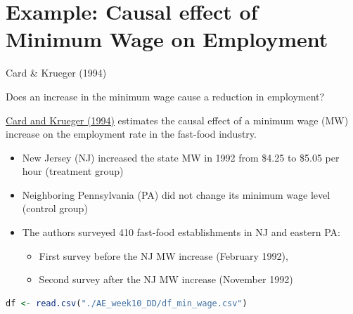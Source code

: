 \documentclass[9pt,aspectratio=169]{beamer}
\begin{document}
\section{Example:  Causal effect of Minimum Wage on Employment}

\begin{frame}[fragile]{Card \& Krueger (1994)}
\linespread{1.3}\selectfont %
\begin{center}
        Does an increase in the minimum wage \alert{cause} a reduction in employment?
    \end{center}
\pause
\hyperlink{https://davidcard.berkeley.edu/papers/njmin-aer.pdf}{Card and Krueger (1994)} estimates the \alert{causal} effect of a minimum wage (MW) increase on the employment rate in the fast-food industry. 
\pause
\begin{itemize}
    \item New Jersey (NJ) increased the state MW in 1992 from \$4.25 to \$5.05 per hour \alert{(treatment group)}
    \item Neighboring Pennsylvania (PA) did not change its minimum wage level \\
    \alert{(control group)}
    \item The authors surveyed 410 fast-food establishments in NJ and eastern PA:
    \begin{itemize}
        \item First survey \alert{before} the NJ MW increase (February 1992), 
        \item Second survey \alert{after} the NJ MW increase (November 1992)
    \end{itemize} 
\end{itemize}
\pause
\vspace{0.3cm}
\begin{lstlisting}[language=R]
        df <- read.csv("./AE_week10_DD/df_min_wage.csv")
    \end{lstlisting}
\end{frame}
\end{document}
